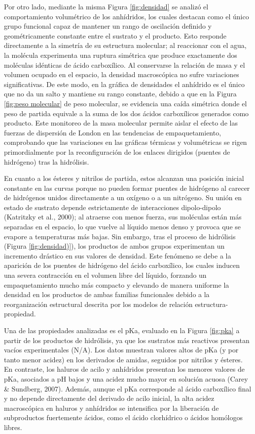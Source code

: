 \documentclass{article}
\begin{document}
Por otro lado, mediante la misma Figura \ref{fig:densidad} se analizó el comportamiento volumétrico de los anhídridos, los cuales destacan como el único grupo funcional capaz de mantener un rango de oscilación definido y geométricamente constante entre el sustrato y el producto. Esto responde directamente a la simetría de su estructura molecular; al reaccionar con el agua, la molécula experimenta una ruptura simétrica que produce exactamente dos moléculas idénticas de ácido carboxílico. Al conservarse la relación de masa y el volumen ocupado en el espacio, la densidad macroscópica no sufre variaciones significativas. De este modo, en la gráfica de densidades el anhídrido es el único que no da un salto y mantiene su rango constante, debido a que en la Figura \ref{fig:peso molecular} de peso molecular, se evidencia una caída simétrica donde el peso de partida equivale a la suma de los dos ácidos carboxílicos generados como producto. Este monitoreo de la masa molecular permite aislar el efecto de las fuerzas de dispersión de London en las tendencias de empaquetamiento, comprobando que las variaciones en las gráficas térmicas y volumétricas se rigen primordialmente por la reconfiguración de los enlaces dirigidos (puentes de hidrógeno) tras la hidrólisis.

En cuanto a los ésteres y nitrilos de partida, estos alcanzan una posición inicial constante en las curvas porque no pueden formar puentes de hidrógeno al carecer de hidrógenos unidos directamente a un oxígeno o a un nitrógeno. Su unión en estado de sustrato depende estrictamente de interacciones dipolo-dipolo (Katritzky et al., 2000); al atraerse con menos fuerza, sus moléculas están más separadas en el espacio, lo que vuelve al líquido menos denso y provoca que se evapore a temperaturas más bajas. Sin embargo, tras el proceso de hidrólisis (Figura \ref{fig:densidad)}), los productos de ambos grupos experimentan un incremento drástico en sus valores de densidad. Este fenómeno se debe a la aparición de los puentes de hidrógeno del ácido carboxílico, los cuales inducen una severa contracción en el volumen libre del líquido, forzando un empaquetamiento mucho más compacto y elevando de manera uniforme la densidad en los productos de ambas familias funcionales debido a la reorganización estructural descrita por los modelos de relación estructura-propiedad.

Una de las propiedades analizadas es el pKa, evaluado en la Figura \ref{fig:pka} a partir de los productos de hidrólisis, ya que los sustratos más reactivos presentan vacíos experimentales (N/A). Los datos muestran valores altos de pKa (y por tanto menor acidez) en los derivados de amidas, seguidos por nitrilos y ésteres. En contraste, los haluros de acilo y anhídridos presentan los menores valores de pKa, asociados a pH bajos y una acidez mucho mayor en solución acuosa (Carey \& Sundberg, 2007). Además, aunque el pKa corresponde al ácido carboxílico final y no depende directamente del derivado de acilo inicial, la alta acidez macroscópica en haluros y anhídridos se intensifica por la liberación de subproductos fuertemente ácidos, como el ácido clorhídrico o ácidos homólogos libres.
\end{document}
